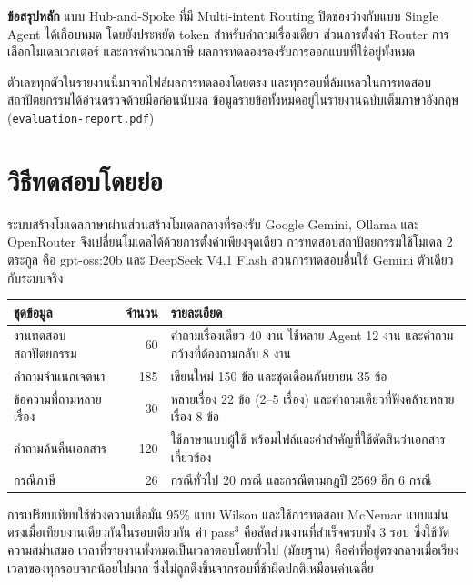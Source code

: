 \documentclass[12pt,a4paper]{article}
\begin{document}
\begin{takeaway}
\textbf{ข้อสรุปหลัก} \quad แบบ Hub-and-Spoke ที่มี Multi-intent Routing ปิดช่องว่างกับแบบ Single Agent ได้เกือบหมด โดยยังประหยัด token สำหรับคำถามเรื่องเดียว ส่วนการตั้งค่า Router การเลือกโมเดลเวกเตอร์ และการคำนวณภาษี ผลการทดลองรองรับการออกแบบที่ใช้อยู่ทั้งหมด
\end{takeaway}

ตัวเลขทุกตัวในรายงานนี้มาจากไฟล์ผลการทดลองโดยตรง และทุกรอบที่ล้มเหลวในการทดสอบสถาปัตยกรรมได้อ่านตรวจด้วยมือก่อนนับผล ข้อมูลรายข้อทั้งหมดอยู่ในรายงานฉบับเต็มภาษาอังกฤษ (\texttt{evaluation-report.pdf})

\clearpage

\section{วิธีทดสอบโดยย่อ}

ระบบสร้างโมเดลภาษาผ่านส่วนสร้างโมเดลกลางที่รองรับ Google Gemini, Ollama และ OpenRouter จึงเปลี่ยนโมเดลได้ด้วยการตั้งค่าเพียงจุดเดียว การทดสอบสถาปัตยกรรมใช้โมเดล 2 ตระกูล คือ gpt-oss:20b และ DeepSeek V4.1 Flash ส่วนการทดสอบอื่นใช้ Gemini ตัวเดียวกับระบบจริง

\begin{table}[H]
\centering
\small
\begin{tabular}{lrL{9.5cm}}
\toprule
\textbf{ชุดข้อมูล} & \textbf{จำนวน} & \textbf{รายละเอียด} \\
\midrule
งานทดสอบสถาปัตยกรรม & 60 & คำถามเรื่องเดียว 40 งาน ใช้หลาย Agent 12 งาน และคำถามกว้างที่ต้องถามกลับ 8 งาน \\
คำถามจำแนกเจตนา & 185 & เขียนใหม่ 150 ข้อ และชุดเดือนกันยายน 35 ข้อ \\
ข้อความที่ถามหลายเรื่อง & 30 & หลายเรื่อง 22 ข้อ (2--5 เรื่อง) และคำถามเดียวที่ฟังคล้ายหลายเรื่อง 8 ข้อ \\
คำถามค้นคืนเอกสาร & 120 & ใช้ภาษาแบบผู้ใช้ พร้อมไฟล์และคำสำคัญที่ใช้ตัดสินว่าเอกสารเกี่ยวข้อง \\
กรณีภาษี & 26 & กรณีทั่วไป 20 กรณี และกรณีตามกฎปี 2569 อีก 6 กรณี \\
\bottomrule
\end{tabular}
\end{table}

การเปรียบเทียบใช้ช่วงความเชื่อมั่น 95\% แบบ Wilson และใช้การทดสอบ McNemar แบบแม่นตรงเมื่อเทียบงานเดียวกันในรอบเดียวกัน ค่า pass$^3$ คือสัดส่วนงานที่สำเร็จครบทั้ง 3 รอบ ซึ่งใช้วัดความสม่ำเสมอ เวลาที่รายงานทั้งหมดเป็นเวลาตอบโดยทั่วไป (มัธยฐาน) คือค่าที่อยู่ตรงกลางเมื่อเรียงเวลาของทุกรอบจากน้อยไปมาก ซึ่งไม่ถูกดึงขึ้นจากรอบที่ช้าผิดปกติเหมือนค่าเฉลี่ย
\end{document}
